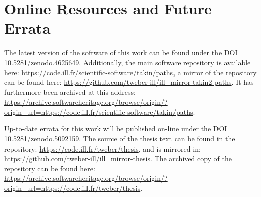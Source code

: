 %
%

\chapter{Online Resources and Future Errata}
\label{ch:online}

The latest version of the software of this work can be found under the DOI 
\href{https://doi.org/10.5281/zenodo.4625649}{10.5281/zenodo.4625649}.
Additionally, the main software repository is available here: 
\url{https://code.ill.fr/scientific-software/takin/paths},
a mirror of the repository can be found here: 
\url{https://github.com/tweber-ill/ill_mirror-takin2-paths}.
It has furthermore been archived at this address:
\url{https://archive.softwareheritage.org/browse/origin/?origin_url=https://code.ill.fr/scientific-software/takin/paths}.

\vspace{0.75cm}

Up-to-date errata for this work will be published on-line under the DOI 
\href{https://doi.org/10.5281/zenodo.5092159}{10.5281/zenodo.5092159}.
The source of the thesis text can be found in the repository:
\url{https://code.ill.fr/tweber/thesis}, and is mirrored in:
\url{https://github.com/tweber-ill/ill_mirror-thesis}.
The archived copy of the repository can be found here:
\url{https://archive.softwareheritage.org/browse/origin/?origin_url=https://code.ill.fr/tweber/thesis}.
